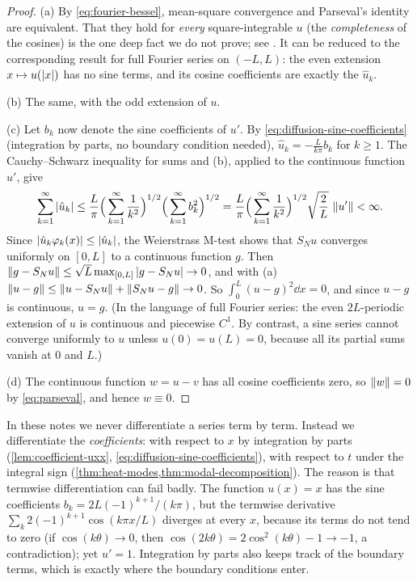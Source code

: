 \begin{proof}
(a) By \eqref{eq:fourier-bessel}, mean-square convergence and Parseval's identity
are equivalent. That they hold for \emph{every} square-integrable $u$ (the
\emph{completeness} of the cosines) is the one deep fact we do not prove; see
\cite[Ch.~5]{Strauss2008}. It can be reduced to the corresponding result for full
Fourier series on $(-L,L)$: the even extension $x\mapsto u(\left\lvert x\right\rvert)$ has no sine
terms, and its cosine coefficients are exactly the $\hat u_k$.

(b) The same, with the odd extension of $u$.

(c) Let $b_k$ now denote the sine coefficients of $u'$. By
\eqref{eq:diffusion-sine-coefficients} (integration by parts, no boundary condition
needed), $\hat u_k=-\frac{L}{k\pi}b_k$ for $k\ge1$. The Cauchy--Schwarz inequality for
sums and (b), applied to the continuous function $u'$, give
\begin{equation*}
  \sum_{k=1}^\infty\left\lvert \hat u_k\right\rvert
  \le \frac L\pi\Big(\sum_{k=1}^\infty\frac1{k^2}\Big)^{1/2}
      \Big(\sum_{k=1}^\infty b_k^2\Big)^{1/2}
  = \frac L\pi\Big(\sum_{k=1}^\infty\frac1{k^2}\Big)^{1/2}\sqrt{\frac2L}\,\left\lVert u'\right\rVert
  <\infty .
\end{equation*}
Since $\left\lvert \hat u_k\varphi_k(x)\right\rvert\le\left\lvert \hat u_k\right\rvert$, the Weierstrass M-test shows that
$S_Nu$ converges uniformly on $[0,L]$ to a continuous function $g$. Then
$\left\lVert g-S_Nu\right\rVert\le\sqrt L\max_{[0,L]}\left\lvert g-S_Nu\right\rvert\to0$, and with (a)
$\left\lVert u-g\right\rVert\le\left\lVert u-S_Nu\right\rVert+\left\lVert S_Nu-g\right\rVert\to0$. So $\int_0^L(u-g)^2\dd x=0$, and since
$u-g$ is continuous, $u=g$. (In the language of full Fourier series: the even
$2L$-periodic extension of $u$ is continuous and piecewise $C^1$. By contrast, a sine
series cannot converge uniformly to $u$ unless $u(0)=u(L)=0$, because all its partial
sums vanish at $0$ and $L$.)

(d) The continuous function $w=u-v$ has all cosine coefficients zero, so
$\left\lVert w\right\rVert=0$ by \eqref{eq:parseval}, and hence $w\equiv0$.
\end{proof}

\begin{remark}\label{rem:fourier-differentiation}
In these notes we never differentiate a series term by term. Instead we differentiate
the \emph{coefficients}: with respect to $x$ by integration by parts
(\cref{lem:coefficient-uxx}, \eqref{eq:diffusion-sine-coefficients}), with respect to
$t$ under the integral sign (\cref{thm:heat-modes,thm:modal-decomposition}). The
reason is that termwise differentiation can fail badly. The function $u(x)=x$ has the
sine coefficients $b_k=2L(-1)^{k+1}/(k\pi)$, but the termwise derivative
$\sum_k2(-1)^{k+1}\cos(k\pi x/L)$ diverges at every $x$, because its terms do not tend
to zero (if $\cos(k\theta)\to0$, then $\cos(2k\theta)=2\cos^2(k\theta)-1\to-1$, a
contradiction); yet $u'=1$. Integration by parts also keeps track of the boundary
terms, which is exactly where the boundary conditions enter.
\end{remark}

